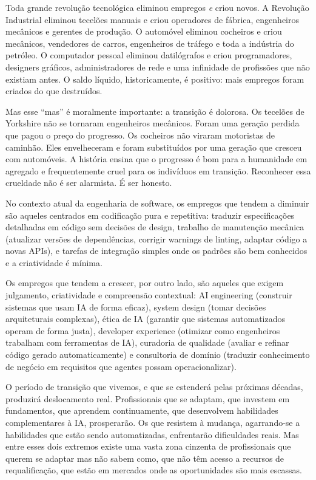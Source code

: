 Toda grande revolução tecnológica eliminou empregos \textit{e} criou
novos. A Revolução Industrial eliminou tecelões manuais e criou
operadores de fábrica, engenheiros mecânicos e gerentes de produção. O
automóvel eliminou cocheiros e criou mecânicos, vendedores de carros,
engenheiros de tráfego e toda a indústria do petróleo. O computador
pessoal eliminou datilógrafos e criou programadores, designers
gráficos, administradores de rede e uma infinidade de profissões que
não existiam antes. O saldo líquido, historicamente, é positivo:
mais empregos foram criados do que destruídos.

Mas esse ``mas'' é moralmente importante: a transição é
dolorosa. Os tecelões de Yorkshire não se tornaram engenheiros
mecânicos. Foram uma geração perdida que pagou o preço do progresso.
Os cocheiros não viraram motoristas de caminhão. Eles envelheceram
e foram substituídos por uma geração que cresceu com automóveis. A
história ensina que o progresso é bom para a humanidade em agregado e
frequentemente cruel para os indivíduos em transição. Reconhecer essa
crueldade não é ser alarmista. É ser honesto.

No contexto atual da engenharia de software, os empregos que tendem a
diminuir são aqueles centrados em codificação pura e repetitiva:
traduzir especificações detalhadas em código sem decisões de design,
trabalho de manutenção mecânica (atualizar versões de dependências,
corrigir warnings de linting, adaptar código a novas APIs), e tarefas
de integração simples onde os padrões são bem conhecidos e a
criatividade é mínima.

Os empregos que tendem a crescer, por outro lado, são aqueles que
exigem julgamento, criatividade e compreensão contextual: AI
engineering (construir sistemas que usam IA de forma eficaz), system
design (tomar decisões arquiteturais complexas), ética de IA (garantir
que sistemas automatizados operam de forma justa), developer experience
(otimizar como engenheiros trabalham com ferramentas de IA), curadoria
de qualidade (avaliar e refinar código gerado automaticamente) e
consultoria de domínio (traduzir conhecimento de negócio em requisitos
que agentes possam operacionalizar).

O período de transição que vivemos, e que se estenderá pelas próximas
décadas, produzirá deslocamento real. Profissionais que se adaptam,
que investem em fundamentos, que aprendem continuamente, que desenvolvem
habilidades complementares à IA, prosperarão. Os que resistem à
mudança, agarrando-se a habilidades que estão sendo automatizadas,
enfrentarão dificuldades reais. Mas entre esses dois extremos existe
uma vasta zona cinzenta de profissionais que querem se adaptar mas não
sabem como, que não têm acesso a recursos de requalificação, que estão
em mercados onde as oportunidades são mais escassas.

